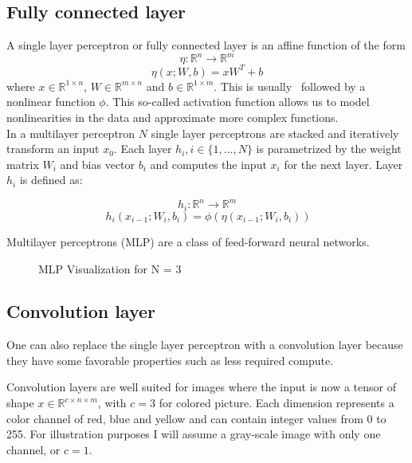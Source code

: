 \documentclass{article}
\begin{document}
\subsection{Fully connected layer}
A single layer perceptron or fully connected layer is an affine function of the form 
\begin{equation}
    \eta: 	\mathbb{R}^n \xrightarrow{} \mathbb{R}^m
\end{equation}
\begin{equation*}
    \eta(x; W, b) = x W^T + b
\end{equation*}
where $x\in \mathbb{R}^{1 \times n} $, $W\in \mathbb{R}^{m \times n}$ and $ b \in \mathbb{R}^{1 \times m}$.
This is usually~\cite{kulathunga2020effects} followed by a nonlinear function $\phi$. This so-called activation function allows us
to model nonlinearities in the data and approximate more complex functions.\\

\noindent In a multilayer perceptron $N$ single layer perceptrons are stacked and iteratively transform an input $x_0$. 
Each layer $h_i, i \in \{1, ..., N\}$ is parametrized by the weight matrix $W_i$ and bias vector $b_i$ and computes
the input $x_i$ for the next layer. Layer $h_i$ is defined as:

\begin{equation}
    h_i: \mathbb{R}^n \xrightarrow{} \mathbb{R}^m
\end{equation}
\begin{equation*}\
    h_i(x_{i-1}; W_i, b_i) = \phi(\eta(x_{i-1}; W_i, b_i))
\end{equation*}
 
\noindent Multilayer perceptrons (MLP) are a class of feed-forward neural networks.
\begin{figure}[htbp]
  \centering
  
  \caption{MLP Visualization for N = 3}
\end{figure}

\subsection{Convolution layer}
\noindent One can also replace the single layer perceptron with a convolution layer because they have some
favorable properties such as less required compute. 

\noindent Convolution layers are well suited for images where the input is now a tensor
of shape $x \in \mathbb{R}^{c \times n \times m}$, with $c = 3$ for colored
picture. Each dimension represents a color channel of red, blue and yellow and
can contain integer values from 0 to 255. For illustration purposes I will assume
a gray-scale image with only one channel, or $c = 1$.
\end{document}
